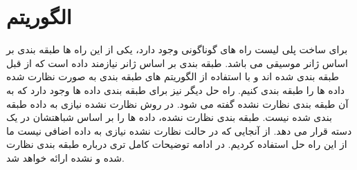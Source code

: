 \documentclass[conference]{IEEEtran}
\begin{document}
        \section{ الگوریتم } 
برای ساخت پلی لیست راه های گوناگونی وجود دارد، یکی از این راه ها طبقه بندی بر اساس ژانر موسیقی می باشد. طبقه بندی بر اساس ژانر نیازمند داده است که از قبل طبقه بندی شده اند و با استفاده از الگوریتم های طبقه بندی   به صورت نظارت شده   داده ها را طبقه بندی کنیم. راه حل دیگر نیز برای طبقه بندی داده ها وجود دارد که به آن طبقه بندی نظارت نشده    گفته می شود. در روش نظارت نشده نیازی به داده طبقه بندی شده نیست. طبقه بندی نظارت نشده، داده ها را بر اساس شباهتشان در یک دسته قرار می دهد. از آنجایی که در حالت نظارت نشده نیازی به داده اضافی نیست ما از این راه حل استفاده کردیم. در ادامه توضیحات کامل تری درباره طبقه بندی نظارت شده و نشده ارائه خواهد شد.
\end{document}
